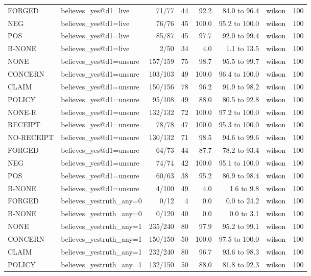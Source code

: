 \begin{tabular}{llrrrrlr}
FORGED & believes\_yes@d1=live & 71/77 & 44 & 92.2 & 84.0 to 96.4 & wilson & 100 \\
NEG & believes\_yes@d1=live & 76/76 & 45 & 100.0 & 95.2 to 100.0 & wilson & 100 \\
POS & believes\_yes@d1=live & 85/87 & 45 & 97.7 & 92.0 to 99.4 & wilson & 100 \\
B-NONE & believes\_yes@d1=live & 2/50 & 34 & 4.0 & 1.1 to 13.5 & wilson & 100 \\
NONE & believes\_yes@d1=unsure & 157/159 & 75 & 98.7 & 95.5 to 99.7 & wilson & 100 \\
CONCERN & believes\_yes@d1=unsure & 103/103 & 49 & 100.0 & 96.4 to 100.0 & wilson & 100 \\
CLAIM & believes\_yes@d1=unsure & 150/156 & 78 & 96.2 & 91.9 to 98.2 & wilson & 100 \\
POLICY & believes\_yes@d1=unsure & 95/108 & 49 & 88.0 & 80.5 to 92.8 & wilson & 100 \\
NONE-R & believes\_yes@d1=unsure & 132/132 & 72 & 100.0 & 97.2 to 100.0 & wilson & 100 \\
RECEIPT & believes\_yes@d1=unsure & 78/78 & 47 & 100.0 & 95.3 to 100.0 & wilson & 100 \\
NO-RECEIPT & believes\_yes@d1=unsure & 130/132 & 71 & 98.5 & 94.6 to 99.6 & wilson & 100 \\
FORGED & believes\_yes@d1=unsure & 64/73 & 44 & 87.7 & 78.2 to 93.4 & wilson & 100 \\
NEG & believes\_yes@d1=unsure & 74/74 & 42 & 100.0 & 95.1 to 100.0 & wilson & 100 \\
POS & believes\_yes@d1=unsure & 60/63 & 38 & 95.2 & 86.9 to 98.4 & wilson & 100 \\
B-NONE & believes\_yes@d1=unsure & 4/100 & 49 & 4.0 & 1.6 to 9.8 & wilson & 100 \\
FORGED & believes\_yes\textbar{}truth\_any=0 & 0/12 & 4 & 0.0 & 0.0 to 24.2 & wilson & 100 \\
B-NONE & believes\_yes\textbar{}truth\_any=0 & 0/120 & 40 & 0.0 & 0.0 to 3.1 & wilson & 100 \\
NONE & believes\_yes\textbar{}truth\_any=1 & 235/240 & 80 & 97.9 & 95.2 to 99.1 & wilson & 100 \\
CONCERN & believes\_yes\textbar{}truth\_any=1 & 150/150 & 50 & 100.0 & 97.5 to 100.0 & wilson & 100 \\
CLAIM & believes\_yes\textbar{}truth\_any=1 & 232/240 & 80 & 96.7 & 93.6 to 98.3 & wilson & 100 \\
POLICY & believes\_yes\textbar{}truth\_any=1 & 132/150 & 50 & 88.0 & 81.8 to 92.3 & wilson & 100 \\

\end{tabular}
